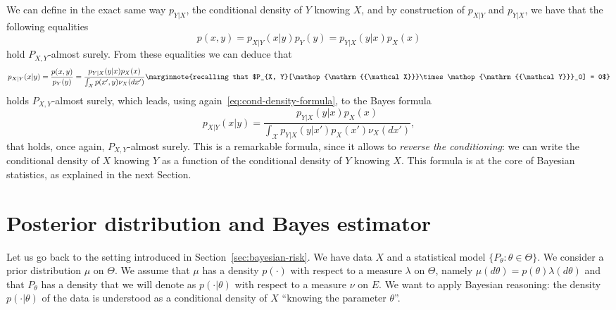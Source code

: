 \documentclass[
	fontsize=11pt, %
	twoside=false, %
	numbers=noenddot, %
]{kaobook}
\DeclareMathOperator{\cX}{{\mathcal X}}
\DeclareMathOperator{\cY}{{\mathcal Y}}
\renewcommand{\P}{\mathbb P}
\begin{document}
We can define in the exact same way $p_{Y | X}$, the conditional density of $Y$ knowing $X$, and by construction of $p_{X | Y}$ and $p_{Y | X}$, we have that the following equalities
\begin{equation}
	\label{eq:cond-density-formula}
	p(x, y) = p_{X | Y}(x | y) p_Y(y) = p_{Y | X}(y | x) p_X(x)
\end{equation}
hold $P_{X, Y}$-almost surely.
From these equalities we can deduce that
\begin{equation*}
	p_{X | Y}(x | y) = \frac{p(x, y)}{p_Y(y)} = \frac{p_{Y | X}(y | x) p_X(x)}{\int_{\cX} p(x', y) \nu_X(dx')}
	\marginnote{recalling that $P_{X, Y}[\cX \times \cY_0] = 0$}
\end{equation*}
holds $P_{X, Y}$-almost surely, which leads, using again~\eqref{eq:cond-density-formula}, to the Bayes formula
\begin{equation}
	\label{eq:bayes-formula-conditional-densities}
	p_{X | Y}(x | y) = \frac{p_{Y | X}(y | x) p_X(x)}{\int_{\cX} p_{Y | X}(y | x') p_X(x') \nu_X(dx')},
\end{equation}
that holds, once again, $P_{X, Y}$-almost surely.
This is a remarkable formula, since it allows to \emph{reverse the conditioning}: we can write the conditional density of $X$ knowing $Y$ as a function of the conditional density of $Y$ knowing $X$.
This formula is at the core of Bayesian statistics, as explained in the next Section.


\section{Posterior distribution and Bayes estimator} %
\label{sec:posterior_distribution_and_bayes_estimator}

Let us go back to the setting introduced in Section~\ref{sec:bayesian-risk}.
We have data $X$ and a statistical model $\{ P_\theta : \theta \in \Theta \}$.
We consider a prior distribution $\mu$ on $\Theta$.
We assume that $\mu$ has a density $p(\cdot)$ with respect to a measure $\lambda$ on $\Theta$, namely $\mu(d \theta) = p(\theta) \lambda(d \theta)$ and that $P_\theta$ has a density that we will denote as $p(\cdot | \theta)$ with respect to a measure $\nu$ on $E$.
We want to apply Bayesian reasoning: the density $p(\cdot | \theta)$ of the data is understood as a  conditional density of $X$ ``knowing the parameter $\theta$''.
\end{document}
